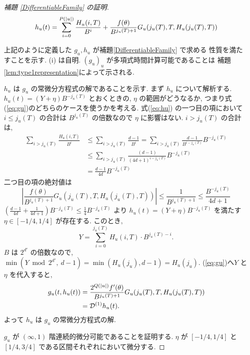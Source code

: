 \begin{proof}[\rm 補題 \ref{DifferentiableFamily} の証明]
 \begin{equation} 
  h_u(t) = \sum^{{P(|u|)}}_{i=0} \frac{H_u(i, T)}{B^i}  
  + \frac{f(\theta)}{B^{j_u(T)+1}} G_u(j_u(T), T, H_u(j_u(T), T)) 
  \label{eq:hu}
 \end{equation}

 上記のように定義した $g_u, h_u$ が補題\ref{DifferentiableFamily} で求める
 性質を満たすことを示す. (i) は自明. 
 $(g_u)_u$ が多項式時間計算可能であることは
 補題 \ref{lem:type1representation}によって示される.

 $h_u$ は $g_u$ の常微分方程式の解であることを示す.
 まず $h_u$ について解析する. 
  $h_u(t) = (Y + \eta) B^{-j_u(T)}$ とおくときの, $\eta$ の範囲がどうなるか,
  つまり式(\ref{eq:gu})のどちらのケースを使うかを考える.
  式(\ref{eq:hu}) の一つ目の項において
 $i \le j_u(T)$ の合計は $B^{j_u(T)}$ の倍数なので $\eta$ に影響はない.
  $i > j_u(T)$ の合計は, 
 \begin{align*}
  \sum_{i>j_u(T)} \frac{H_u(i, T)}{B^i} 
  & \le \sum_{i>j_u(T)} \frac{d-1}{B^i} 
   = \sum_{i>j_u(T)} \frac{d-1}{B^{i-j_u(T)}}B^{-j_u(T)} \\
  & \le \sum_{i>j_u(T)} \frac{(d-1)}{(4d+1)^{i-j_u(T)}}B^{-j_u(T)} \\
  & = \frac{d-1}{4d}B^{-j_u(T)}
 \end{align*}
 二つ目の項の絶対値は
 \begin{equation}
  \left| \frac{f(\theta)}{B^{j_u(T)+1}} G_u(j_u(T), T, H_u(j_u(T), T)) \right|
  \le \frac{1}{B^{j_u(T)+1}}
  \le \frac{B^{-j_u(T)}}{4d+1}
 \end{equation}
 $(\frac{d-1}{4d} + \frac{1}{4d+1})B^{-j_u(T)} \le \frac 1 4 B^{-j_u(T)} $
  より $h_u(t) = (Y + \eta) B^{-j_u(T)}$ を満たす $\eta \in [-1/4, 1/4]$
 が存在する. このとき,
 \begin{equation}
  Y = \sum_{i=0}^{j_u(T)}H_u(i, T) \cdot B^{j_u(T) - i} .
 \end{equation}
 $B$ は $2^{d'}$ の倍数なので, 
 $\min (Y \bmod 2^{d'}\!\!\!,\ d-1) = \min (H_u(j_u), d-1) = H_u(j_u)$. 
 (\ref{eq:gu})へ$Y$ と $\eta$ を代入すると,
 \begin{align*}
   g_u(t, h_u(t)) 
  & =  \frac{2^{Q(|u|)} f'(\theta)}{B^{j_u(T)+1}}
   G_u(j_u(T), T, H_u(j_u(T), T)) \\
  & =  \mathcal D^{(1)}h_u(t).
 \end{align*}
 よって $h_u$ は $g_u$ の常微分方程式の解.

  $g_u$ が $(\infty, 1)$ 階連続的微分可能であることを証明する.
  $\eta$ が $[-1/4, 1/4]$ と $[1/4, 3/4]$ である区間それぞれにおいて微分する.


\end{proof}
